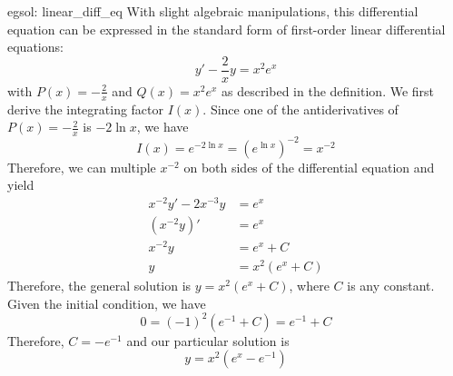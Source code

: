 \begin{egsol}[]{egsol: linear_diff_eq}
    With slight algebraic manipulations, this differential equation can be expressed in the standard form of first-order linear differential equations:
    \[y' - \frac{2}{x}y = x^2e^x\]
    with $P(x) = -\frac{2}{x}$ and $Q(x) = x^2e^x$ as described in the definition.  We first derive the integrating factor $I(x)$.  Since one of the antiderivatives of $P(x) = -\frac{2}{x}$ is $-2\ln x$, we have 
    \[I(x) = e^{-2\ln x} = (e^{\ln x})^{-2} = x^{-2}\]
    Therefore, we can multiple $x^{-2}$ on both sides of the differential equation and yield
    \begin{align*}
        x^{-2}y' - 2x^{-3}y &= e^x\\
        (x^{-2}y)' &= e^x\\
        x^{-2}y &= e^x + C\\
        y &= x^2(e^x + C)
    \end{align*}
    Therefore, the general solution is $y = x^2(e^x + C)$, where $C$ is any constant.  Given the initial condition, we have
    \[0 = (-1)^2(e^{-1} + C) = e^{-1} + C\]
    Therefore, $C = -e^{-1}$ and our particular solution is
    \[y = x^2 (e^x - e^{-1})\]
\end{egsol}